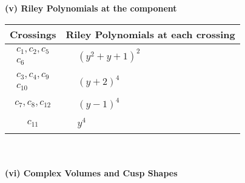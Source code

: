 \documentclass[1p]{elsarticle_modified}
\theoremstyle{definition}
\begin{document}
\newpage\renewcommand{\arraystretch}{1}
\flushleft \textbf{(v) Riley Polynomials at the component}\newline \\
\begin{tabular}{m{50pt}|m{274pt}}
Crossings & \hspace{64pt}Riley Polynomials at each crossing \\
\hline $$\begin{aligned}c_{1},c_{2},c_{5}\\c_{6}\end{aligned}$$&$\begin{aligned}
&(y^2+y+1)^2
\end{aligned}$\\
\hline $$\begin{aligned}c_{3},c_{4},c_{9}\\c_{10}\end{aligned}$$&$\begin{aligned}
&(y+2)^4
\end{aligned}$\\
\hline $$\begin{aligned}c_{7},c_{8},c_{12}\end{aligned}$$&$\begin{aligned}
&(y-1)^4
\end{aligned}$\\
\hline $$\begin{aligned}c_{11}\end{aligned}$$&$\begin{aligned}
&y^4
\end{aligned}$\\
\hline
\end{tabular}\\~\\
\newpage\flushleft \textbf{(vi) Complex Volumes and Cusp Shapes}
\end{document}
